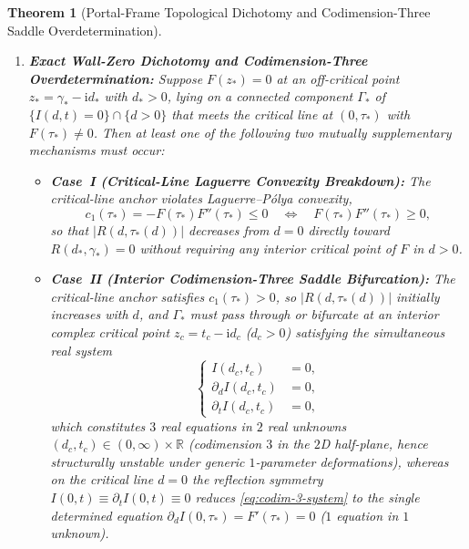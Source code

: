 \documentclass[11pt,reqno]{amsart}
\newtheorem{theorem}{Theorem}[section]
\theoremstyle{definition}
\theoremstyle{remark}
\numberwithin{equation}{section}
\newcommand{\ii}{\mathrm{i}}
\begin{document}
\begin{theorem}[Portal-Frame Topological Dichotomy and Codimension-Three Saddle Overdetermination]
\begin{enumerate}[label=\upshape(\alph*),leftmargin=2.2em]
\begin{equation}
\end{equation}
\item \textbf{Exact Wall-Zero Dichotomy and Codimension-Three Overdetermination:} Suppose $F(z_*)=0$ at an off-critical point $z_* = \gamma_* - \ii d_*$ with $d_* > 0$, lying on a connected component $\Gamma_*$ of $\{I(d,t)=0\} \cap \{d>0\}$ that meets the critical line at $(0,\tau_*)$ with $F(\tau_*)\ne 0$. Then at least one of the following two mutually supplementary mechanisms must occur:
\begin{itemize}[leftmargin=1.8em]
\item \textbf{Case~I (Critical-Line Laguerre Convexity Breakdown):} The critical-line anchor violates Laguerre--P\'{o}lya convexity,
\begin{equation}\label{eq:case-I}
c_1(\tau_*) = -F(\tau_*)F''(\tau_*) \le 0 \quad \Longleftrightarrow \quad F(\tau_*)F''(\tau_*) \ge 0,
\end{equation}
so that $|R(d,\tau_*(d))|$ decreases from $d=0$ directly toward $R(d_*,\gamma_*)=0$ without requiring any interior critical point of $F$ in $d>0$.
\item \textbf{Case~II (Interior Codimension-Three Saddle Bifurcation):} The critical-line anchor satisfies $c_1(\tau_*)>0$, so $|R(d,\tau_*(d))|$ initially increases with $d$, and $\Gamma_*$ must pass through or bifurcate at an interior complex critical point $z_c = t_c - \ii d_c$ ($d_c > 0$) satisfying the simultaneous real system
\begin{equation}\label{eq:codim-3-system}
\left\{\begin{aligned}
I(d_c,t_c) &= 0, \\
\partial_d I(d_c,t_c) &= 0, \\
\partial_t I(d_c,t_c) &= 0,
\end{aligned}\right.
\end{equation}
which constitutes $3$ real equations in $2$ real unknowns $(d_c,t_c) \in (0,\infty)\times\mathbb{R}$ (codimension $3$ in the $2$D half-plane, hence structurally unstable under generic $1$-parameter deformations), whereas on the critical line $d=0$ the reflection symmetry $I(0,t)\equiv \partial_t I(0,t)\equiv 0$ reduces \eqref{eq:codim-3-system} to the single determined equation $\partial_d I(0,\tau_*)=F'(\tau_*)=0$ ($1$ equation in $1$ unknown).
\end{itemize}
\end{enumerate}
\end{theorem}
\end{document}
